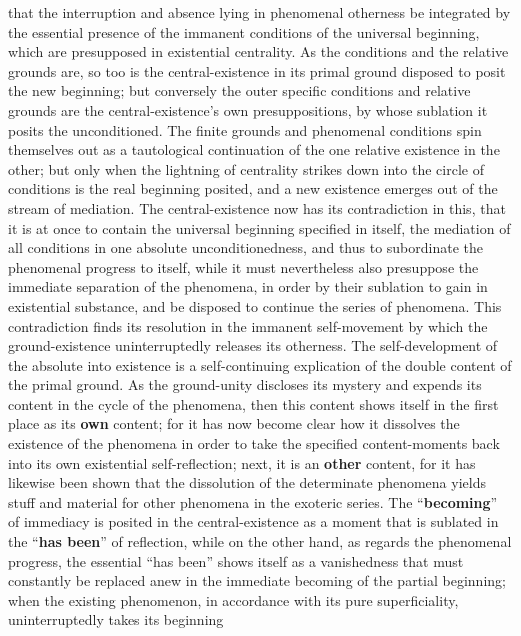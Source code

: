 \documentclass[12pt,a4paper,openany]{book}
\newcommand{\opage}[1]{\marginnote{\footnotesize\textit{[#1]}}}
\begin{document}
that the interruption and absence lying in
phenomenal otherness be integrated by the essential
presence of the immanent conditions of the universal beginning,
which are presupposed in existential centrality.
As the conditions and the relative grounds are,
so too is the central-existence in its primal ground
disposed to posit the new beginning; but
conversely the outer specific conditions and relative
grounds are the central-existence's own presuppositions,
by whose sublation it posits the unconditioned. The
finite grounds and phenomenal conditions spin themselves
out as a tautological continuation of the one relative
existence in the other; but only when the lightning of centrality
strikes down into the circle of conditions is
the real beginning posited, and a new existence emerges
out of the stream of mediation.
The central-existence now has its contradiction in this, that it
is at once to contain the universal beginning specified
in itself, the mediation of all conditions
in one absolute unconditionedness, and thus to subordinate
the phenomenal progress to itself, while it must nevertheless also
presuppose the immediate
separation of the phenomena, in order by their sublation to gain in existential
substance, and be disposed to continue the series of phenomena. This contradiction finds its
resolution in the immanent self-movement by which
the ground-existence uninterruptedly releases its otherness.
The self-development of the absolute into existence is a self-continuing
explication of the double
\setcounter{footnote}{0}%
\opage{168}content of the primal ground. As the ground-unity discloses its mystery
and expends its content in the cycle of the phenomena,
then this content shows itself in the first place as its
\textbf{own} content; for it has now become clear how
it dissolves the existence of the phenomena in order to take
the specified content-moments back into its own
existential self-reflection; next, it is an \textbf{other}
content, for it has likewise been shown that the dissolution of the determinate
phenomena yields stuff and material
for other phenomena in the exoteric series.
The ``\textbf{becoming}'' of immediacy is posited in the central-existence
as a moment that is sublated in the ``\textbf{has been}''
of reflection, while on the other hand, as regards the phenomenal
progress, the essential ``has been''
shows itself as a vanishedness that must constantly
be replaced anew in the immediate becoming of the partial beginning;
when the existing phenomenon, in accordance with its
pure superficiality, uninterruptedly takes its beginning
\end{document}
